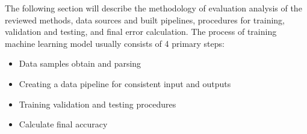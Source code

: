 The following section will describe the methodology of evaluation analysis of the reviewed methods, data sources and built pipelines, procedures for training, validation and testing, and final error calculation.
The process of training machine learning model usually consists of 4 primary steps:
\begin{itemize}
    \item Data samples obtain and parsing\\
    \item Creating a data pipeline for consistent input and outputs\\
    \item Training validation and testing procedures\\
    \item Calculate final accuracy\\
\end{itemize}

